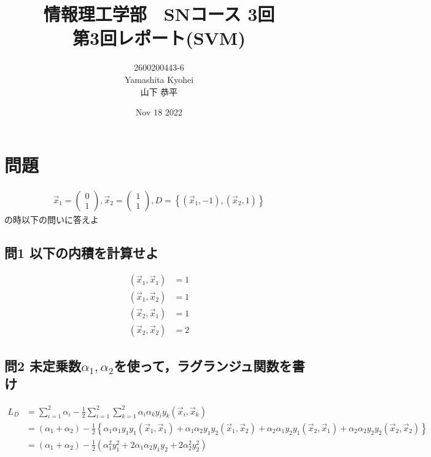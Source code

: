 \documentclass[dvipdfmx,autodetect-engine,titlepage]{jsarticle}
\title{情報理工学部　SNコース 3回\\
第3回レポート(SVM)\\}
\author{2600200443-6\\Yamashita Kyohei\\山下 恭平}
\date{Nov 18 2022}
\begin{document}
\maketitle

\section*{問題}

\begin{align*}
  \overrightarrow{x}_1 
    =
  \begin{pmatrix}
    0 \\
    1  
  \end{pmatrix}
  ,
  \overrightarrow{x}_2 
    =
  \begin{pmatrix}
    1 \\
    1  
  \end{pmatrix}
  ,
  D = \left\{(\overrightarrow{x}_1,-1) , (\overrightarrow{x}_2 , 1)\right\} 
\end{align*}
の時以下の問いに答えよ

\subsection*{問1 以下の内積を計算せよ}

\begin{align*}
  (\overrightarrow{x}_1,\overrightarrow{x}_1) &= 1\\
  (\overrightarrow{x}_1,\overrightarrow{x}_2) &= 1\\
  (\overrightarrow{x}_2,\overrightarrow{x}_1) &= 1\\
  (\overrightarrow{x}_2,\overrightarrow{x}_2) &= 2
\end{align*}


\subsection*{問2 未定乗数\begin{math}\alpha_1,\alpha_2\end{math}を使って，ラグランジュ関数を書け}

\begin{align*}
  L_D &= \sum_{i = 1}^{2} \alpha_i - \frac{1}{2}\sum_{i = 1}^{2} \sum_{k = 1}^{2} \alpha_i \alpha_k y_i y_k(\overrightarrow{x}_i , \overrightarrow{x}_k)\\
      &= (\alpha_1 + \alpha_2) - \frac{1}{2}\left\{\alpha_1 \alpha_1 y_1 y_1 (\overrightarrow{x}_1 , \overrightarrow{x}_1) + \alpha_1 \alpha_2 y_1 y_2 (\overrightarrow{x}_1 , \overrightarrow{x}_2)
        + \alpha_2 \alpha_1 y_2 y_1 (\overrightarrow{x}_2 , \overrightarrow{x}_1) + \alpha_2 \alpha_2 y_2 y_2 (\overrightarrow{x}_2 , \overrightarrow{x}_2)\right\} \\
      &= (\alpha_1 + \alpha_2) - \frac{1}{2}(\alpha_1^2 y_1^2 + 2\alpha_1 \alpha_2 y_1 y_2 + 2\alpha_2^2 y_2^2)
\end{align*}
\end{document}

